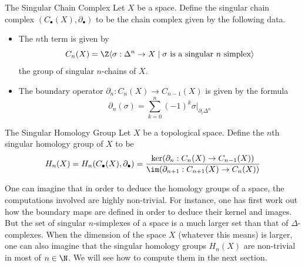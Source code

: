 \documentclass[a4paper]{article}
\begin{document}
\begin{defn}{The Singular Chain Complex}{} Let $X$ be a space. Define the singular chain complex $(C_\bullet(X),\partial_\bullet)$ to be the chain complex given by the following data. 
\begin{itemize}
\item The $n$th term is given by $$C_n(X)=\Z\langle\sigma:\Delta^n\to X\;|\;\sigma\text{ is a singular }n\text{ simplex}\rangle$$ the group of singular $n$-chains of $X$. 
\item The boundary operator $\partial_n:C_n(X)\to C_{n-1}(X)$ is given by the formula $$\partial_n(\sigma)=\sum_{k=0}^n(-1)^k\sigma|_{\partial_i\Delta^n}$$
\end{itemize}
\end{defn}

\begin{defn}{The Singular Homology Group}{} Let $X$ be a topological space. Define the $n$th singular homology group of $X$ to be $$H_n(X)=H_n(C_\bullet(X),\partial_\bullet)=\frac{\ker(\partial_n:C_n(X)\to C_{n-1}(X))}{\im(\partial_{n+1}:C_{n+1}(X)\to C_n(X))}$$
\end{defn}

One can imagine that in order to deduce the homology groups of a space, the computations involved are highly non-trivial. For instance, one has first work out how the boundary maps are defined in order to deduce their kernel and images. But the set of singular $n$-simplexes of a space is a much larger set than that of $\Delta$-complexes. When the dimension of the space $X$ (whatever this means) is larger, one can also imagine that the singular homology groups $H_n(X)$ are non-trivial in most of $n\in\N$. We will see how to compute them in the next section. 
\end{document}
